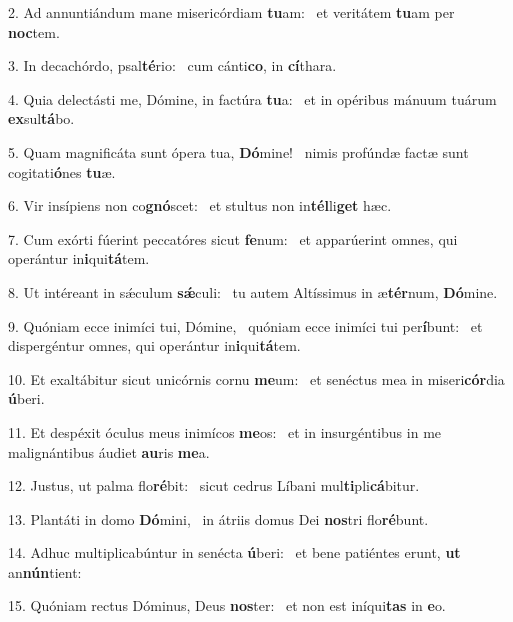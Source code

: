 2. Ad annuntiándum mane misericórdiam \textbf{tu}am: \ast\  et veritátem \textbf{tu}am per \textbf{noc}tem.\

3. In decachórdo, psal\textbf{té}rio: \ast\  cum cánti\textbf{co}, in \textbf{cí}thara.\

4. Quia delectásti me, Dómine, in factúra \textbf{tu}a: \ast\  et in opéribus mánuum tuárum \textbf{ex}sul\textbf{tá}bo.\

5. Quam magnificáta sunt ópera tua, \textbf{Dó}mine! \ast\  nimis profúndæ factæ sunt cogitati\textbf{ó}nes \textbf{tu}æ.\

6. Vir insípiens non co\textbf{gnó}scet: \ast\  et stultus non in\textbf{tél}li\textbf{get} hæc.\

7. Cum exórti fúerint peccatóres sicut \textbf{fe}num: \ast\  et apparúerint omnes, qui operántur in\textbf{i}qui\textbf{tá}tem.\

8. Ut intéreant in sǽculum \textbf{sǽ}culi: \ast\  tu autem Altíssimus in æ\textbf{tér}num, \textbf{Dó}mine.\

9. Quóniam ecce inimíci tui, Dómine, \dag\  quóniam ecce inimíci tui per\textbf{í}bunt: \ast\  et dispergéntur omnes, qui operántur in\textbf{i}qui\textbf{tá}tem.\

10. Et exaltábitur sicut unicórnis cornu \textbf{me}um: \ast\  et senéctus mea in miseri\textbf{cór}dia \textbf{ú}beri.\

11. Et despéxit óculus meus inimícos \textbf{me}os: \ast\  et in insurgéntibus in me malignántibus áudiet \textbf{au}ris \textbf{me}a.\

12. Justus, ut palma flo\textbf{ré}bit: \ast\  sicut cedrus Líbani mul\textbf{ti}pli\textbf{cá}bitur.\

13. Plantáti in domo \textbf{Dó}mini, \ast\  in átriis domus Dei \textbf{nos}tri flo\textbf{ré}bunt.\

14. Adhuc multiplicabúntur in senécta \textbf{ú}beri: \ast\  et bene patiéntes erunt, \textbf{ut} an\textbf{nún}tient:\

15. Quóniam rectus Dóminus, Deus \textbf{nos}ter: \ast\  et non est iníqui\textbf{tas} in \textbf{e}o.\

